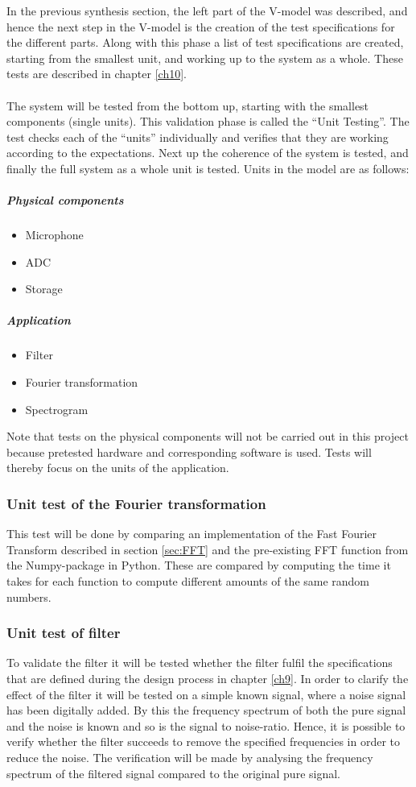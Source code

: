 In the previous synthesis section, the left part of the V-model was described, and hence the next step in the V-model is the creation of the test specifications for the different parts. Along with this phase a list of test specifications are created, starting from the smallest unit, and working up to the system as a whole. These tests are described in chapter \ref{ch10}.
\\ \\
The system will be tested from the bottom up, starting with the smallest components (single units). This validation phase is called the ``Unit Testing''. The test checks each of the ``units'' individually and verifies that they are working according to the expectations. Next up the coherence of the system is tested, and finally the full system as a whole unit is tested. Units in the model are as follows:
\subparagraph{Physical components}  
\begin{itemize}
	\item Microphone
	\item ADC
	\item Storage
\end{itemize}
\subparagraph{Application}
\begin{itemize}
	\item Filter
	\item Fourier transformation
	\item Spectrogram
\end{itemize}
Note that tests on the physical components will not be carried out in this project because pretested hardware and corresponding software is used. Tests will thereby focus on the units of the application.
 
\subsubsection{Unit test of the Fourier transformation}
This test will be done by comparing an implementation of the Fast Fourier Transform described in section \ref{sec:FFT} and the pre-existing FFT function from the Numpy-package in Python. These are compared by computing the time it takes for each function to compute different amounts of the same random numbers.

\subsubsection{Unit test of filter}
To validate the filter it will be tested whether the filter fulfil the specifications that are defined during the design process in chapter \ref{ch9}. In order to clarify the effect of the filter it will be tested on a simple known signal, where a noise signal has been digitally added. By this the frequency spectrum of both the pure signal and the noise is known and so is the signal to noise-ratio. Hence, it is possible to verify whether the filter succeeds to remove the specified frequencies in order to reduce the noise. The verification will be made by analysing the frequency spectrum of the filtered signal compared to the original pure signal. 


